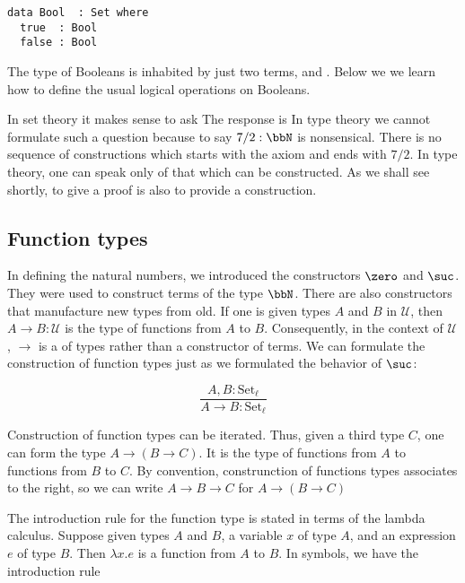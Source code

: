 \begin{verbatim}
data Bool  : Set where
  true  : Bool
  false : Bool
\end{verbatim}

The type of Booleans is inhabited by just two terms,  and .  Below we we learn how to define the usual logical operations on Booleans.


In set theory it makes sense to ask   The response is  In type theory we cannot formulate such a question because to say  $7/2 : \bbN$ is nonsensical. There is no sequence of constructions which starts with the axiom and ends with $7/2$.  In type theory, one can speak only of that which can be constructed.  As we shall see shortly, to give a proof is also to provide a construction.

\subsection{Function types}

In defining the natural numbers, we introduced the constructors $\zero$ and $\suc$.  They were used to construct terms of the type $\bbN$.  There are also constructors that manufacture new types from old.  If one is given types $A$ and $B$ in $\mathcal{U}$, then $A \to B: \mathcal{U}$ is the type of functions from $A$ to $B$.  Consequently, in the context of $\mathcal{U}$, $\to$ is a  of types rather than a constructor of terms.  We can formulate the construction of function types just as we formulated the behavior of $\suc$:

\begin{equation}
\frac{A, B : \text{Set}_\ell}{A \to B : \text{Set}_\ell}
\end{equation}

Construction of function types can be iterated.  Thus, given a third type $C$, one can form the type  $A \to (B \to C)$.  It is the type of functions from $A$ to functions from $B$ to $C$.  
By convention, construnction of functions types associates to the right, so we can write  $A \to B \to C$ for $A \to (B \to C)$ 

The introduction rule for the function type is stated in terms of the lambda calculus.  Suppose given types $A$ and $B$, a variable $x$ of type $A$, and an expression $e$ of type $B$.  Then $\lambda x.e$ is a function from $A$ to $B$.  In symbols, we have the introduction rule

